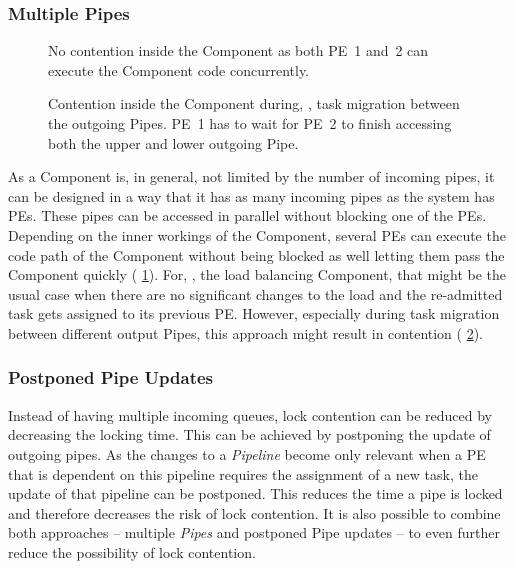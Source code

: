 \subsubsection{Multiple Pipes}

\begin{figure*}[b!]
	\centering
	\begin{subfigure}[t]{0.48\textwidth}\centering
		\caption[No contention inside the Component.]{No contention inside the Component as both PE~1 and~2 can execute the Component code concurrently.}%
		\label{fig:feature:multi1}
	\end{subfigure}
	\hfill
	\begin{subfigure}[t]{0.48\textwidth}\centering
		\caption[Contention inside the Component.]{Contention inside the Component during, \eg{}, task migration between the outgoing Pipes. PE~1 has to wait for PE~2 to finish accessing both the upper and lower outgoing Pipe.}%
		\label{fig:feature:multi2}
	\end{subfigure}%
	\caption[Component with multiple incoming and outgoing Pipes.]{Component with multiple incoming and outgoing Pipes. The PE~1 and~2 are executing the Component's code path at the same time.}%
	\label{fig:feature:multi}
\end{figure*}

As a \cobas{} Component is, in general, not limited by the number of incoming pipes, it can be designed in a way that it has as many incoming pipes as the system has \acp{PE}. These pipes can be accessed in parallel without blocking one of the \acp{PE}. Depending on the inner workings of the Component, several \acp{PE} can execute the code path of the Component without being blocked as well letting them pass the Component quickly (\cf{} \cref{fig:feature:multi1}). For, \eg{}, the load balancing Component, that might be the usual case when there are no significant changes to the load and the re-admitted task gets assigned to its previous \ac{PE}. However, especially during task migration between different output Pipes, this approach might result in contention (\cf{} \cref{fig:feature:multi2}).

\subsubsection{Postponed Pipe Updates}

Instead of having multiple incoming queues, lock contention can be reduced by decreasing the locking time. This can be achieved by postponing the update of outgoing pipes. As the changes to a \emph{Pipeline} become only relevant when a \ac{PE} that is dependent on this pipeline requires the assignment of a new task, the update of that pipeline can be postponed. This reduces the time a pipe is locked and therefore decreases the risk of lock contention. It is also possible to combine both approaches -- multiple \emph{Pipes} and postponed Pipe updates -- to even further reduce the possibility of lock contention.

